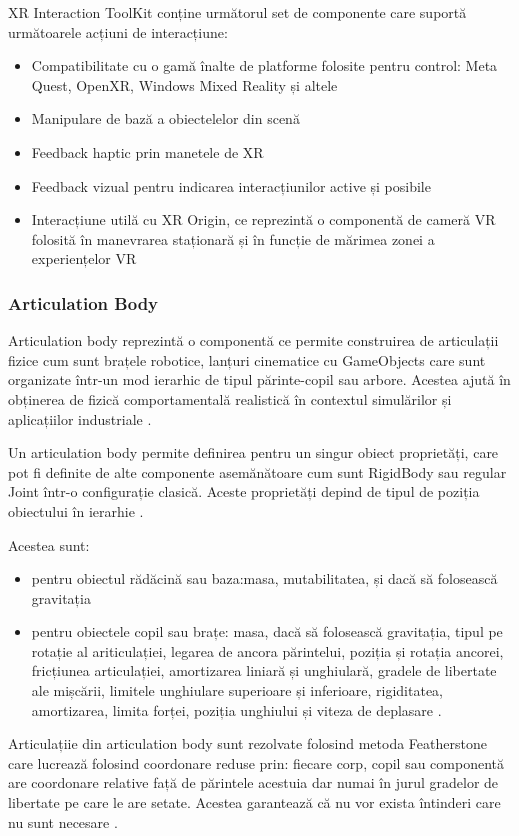 XR Interaction ToolKit conține următorul set de componente care suportă următoarele acțiuni de interacțiune:
\begin{itemize}
	\item Compatibilitate cu o gamă înalte de platforme folosite pentru control: Meta Quest, OpenXR, Windows Mixed Reality și altele \cite{XRI}
	\item Manipulare de bază a obiectelelor din scenă \cite{XRI}
	\item Feedback haptic prin manetele de XR \cite{XRI}
	\item Feedback vizual pentru indicarea interacțiunilor active și posibile \cite{XRI}
	\item Interacțiune utilă cu XR Origin, ce reprezintă o componentă de cameră VR folosită în manevrarea staționară și în funcție de mărimea zonei a experiențelor VR \cite{XRI}
\end{itemize}

\subsubsection{Articulation Body}
Articulation body reprezintă o componentă ce permite construirea de articulații fizice cum sunt brațele robotice, lanțuri cinematice cu GameObjects care sunt organizate într-un mod ierarhic de tipul părinte-copil sau arbore. Acestea ajută în obținerea de fizică comportamentală realistică în contextul simulărilor și aplicațiilor industriale \cite{ABC}.



Un articulation body permite definirea pentru un singur obiect proprietăți, care pot fi definite de alte componente asemănătoare cum sunt RigidBody sau regular Joint într-o configurație clasică. Aceste proprietăți depind de tipul de poziția obiectului în ierarhie \cite{ABC}. 

Acestea sunt:
\begin{itemize}
	\item pentru obiectul rădăcină sau baza:masa, mutabilitatea, și dacă să folosească gravitația \cite{ABC}
	\item pentru obiectele copil sau brațe: masa, dacă să folosească gravitația, tipul pe rotație al ariticulației, legarea de ancora părintelui, poziția și rotația ancorei, fricțiunea articulației, amortizarea liniară și unghiulară, gradele de libertate ale mișcării, limitele unghiulare superioare și inferioare, rigiditatea, amortizarea, limita forței, poziția unghiului și viteza de deplasare \cite{ABC}.
\end{itemize}
Articulațiie din articulation body sunt rezolvate folosind metoda Featherstone care lucrează folosind coordonare reduse prin: fiecare corp, copil sau componentă are coordonare relative față de  părintele acestuia dar numai în jurul gradelor de libertate pe care le are setate. Acestea garantează că nu vor exista întinderi care nu sunt necesare \cite{ABC1}.

